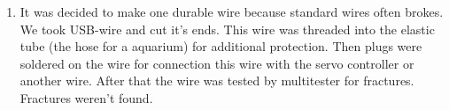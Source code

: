 \begin{enumerate}
\begin{enumerate}
        \item It was decided to make one durable wire because standard wires often brokes. We took USB-wire and cut it's ends. This wire was threaded into the elastic tube (the hose for a aquarium) for additional protection. Then plugs were soldered on the wire for connection this wire with the servo controller or another wire. After that the wire was tested by multitester for fractures. Fractures weren't found.
        \begin{figure}[H]
	  	  \begin{minipage}[h]{0.24\linewidth}
	  	  \end{minipage}
	  	  \hfill
	  	  \begin{minipage}[h]{0.24\linewidth}

\end{minipage}
\end{figure}
\end{enumerate}
\end{enumerate}
